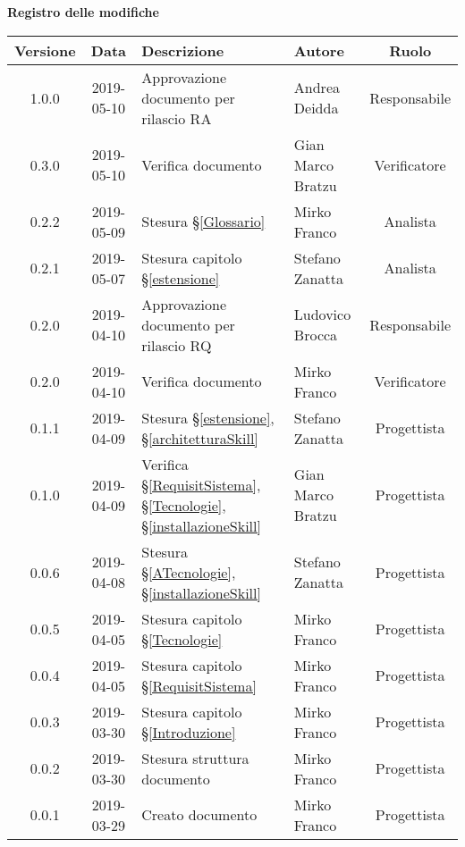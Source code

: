 	\begin{center}
		\textbf{Registro delle modifiche}
	\end{center}
	\begin{center}
		\begin{tabularx}{\textwidth}{|c|c|X|X|c|}
			\hline
			\textbf{Versione} & \textbf{Data} & \textbf{Descrizione} & \textbf{Autore} & \textbf{Ruolo} \\
			\hline
			1.0.0 & 2019-05-10 & Approvazione documento per rilascio RA & Andrea Deidda & Responsabile \\
			\hline
			0.3.0 & 2019-05-10 & Verifica documento & Gian Marco Bratzu & Verificatore \\
			\hline
			0.2.2 & 2019-05-09 & Stesura \S\ref{Glossario} & Mirko Franco & Analista \\
			\hline
			0.2.1 & 2019-05-07 & Stesura capitolo \S\ref{estensione} & Stefano Zanatta & Analista \\
			\hline
			0.2.0 & 2019-04-10 & Approvazione documento per rilascio RQ & Ludovico Brocca & Responsabile \\		
			\hline
			0.2.0 & 2019-04-10 & Verifica documento & Mirko Franco & Verificatore \\		
			\hline
			0.1.1 & 2019-04-09 & Stesura \S\ref{estensione}, \S\ref{architetturaSkill} & Stefano Zanatta & Progettista \\
			\hline
			0.1.0 & 2019-04-09 & Verifica \S\ref{RequisitSistema}, \S\ref{Tecnologie}, \S\ref{installazioneSkill} & Gian Marco Bratzu & Progettista \\
			\hline
			0.0.6 & 2019-04-08 & Stesura \S\ref{ATecnologie}, \S\ref{installazioneSkill} & Stefano Zanatta & Progettista \\
			\hline
			0.0.5 & 2019-04-05 & Stesura capitolo \S\ref{Tecnologie} & Mirko Franco & Progettista \\
			\hline
			0.0.4 & 2019-04-05 & Stesura capitolo \S\ref{RequisitSistema} & Mirko Franco & Progettista \\
			\hline
			0.0.3 & 2019-03-30 & Stesura capitolo \S\ref{Introduzione} & Mirko Franco & Progettista \\
			\hline
			0.0.2 & 2019-03-30 & Stesura struttura documento & Mirko Franco & Progettista \\
			\hline
			0.0.1 & 2019-03-29 & Creato documento & Mirko Franco & Progettista \\
			\hline
		\end{tabularx}
	\end{center}
\newpage